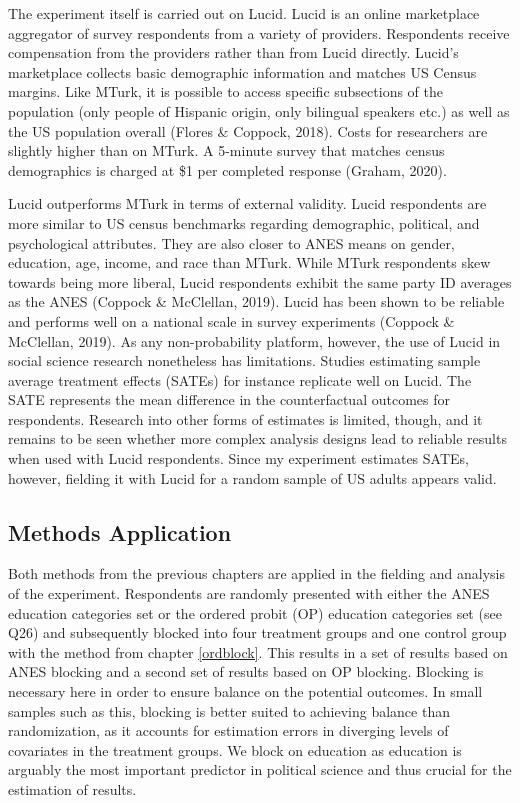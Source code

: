 \documentclass[12pt,econ]{sources/authesis}
\begin{document}
The experiment itself is carried out on Lucid. Lucid is an online marketplace aggregator of survey respondents from a variety of providers. Respondents receive compensation from the providers rather than from Lucid directly. Lucid's marketplace collects basic demographic information and matches US Census margins. Like MTurk, it is possible to access specific subsections of the population (only people of Hispanic origin, only bilingual speakers etc.) as well as the US population overall (Flores \& Coppock, 2018). Costs for researchers are slightly higher than on MTurk. A 5-minute survey that matches census demographics is charged at \$1 per completed response (Graham, 2020).

Lucid outperforms MTurk in terms of external validity. Lucid respondents are more similar to US census benchmarks regarding demographic, political, and psychological attributes. They are also closer to ANES means on gender, education, age, income, and race than MTurk. While MTurk respondents skew towards being more liberal, Lucid respondents exhibit the same party ID averages as the ANES (Coppock \& McClellan, 2019). Lucid has been shown to be reliable and performs well on a national scale in survey experiments (Coppock \& McClellan, 2019). As any non-probability platform, however, the use of Lucid in social science research nonetheless has limitations. Studies estimating sample average treatment effects (SATEs) for instance replicate well on Lucid. The SATE represents the mean difference in the counterfactual outcomes for respondents. Research into other forms of estimates is limited, though, and it remains to be seen whether more complex analysis designs lead to reliable results when used with Lucid respondents. Since my experiment estimates SATEs, however, fielding it with Lucid for a random sample of US adults appears valid.

\hypertarget{framing-data-methods}{%
\subsection{Methods Application}\label{framing-data-methods}}

Both methods from the previous chapters are applied in the fielding and analysis of the experiment. Respondents are randomly presented with either the ANES education categories set or the ordered probit (OP) education categories set (see Q26) and subsequently blocked into four treatment groups and one control group with the method from chapter \ref{ordblock}. This results in a set of results based on ANES blocking and a second set of results based on OP blocking. Blocking is necessary here in order to ensure balance on the potential outcomes. In small samples such as this, blocking is better suited to achieving balance than randomization, as it accounts for estimation errors in diverging levels of covariates in the treatment groups. We block on education as education is arguably the most important predictor in political science and thus crucial for the estimation of results.
\end{document}
